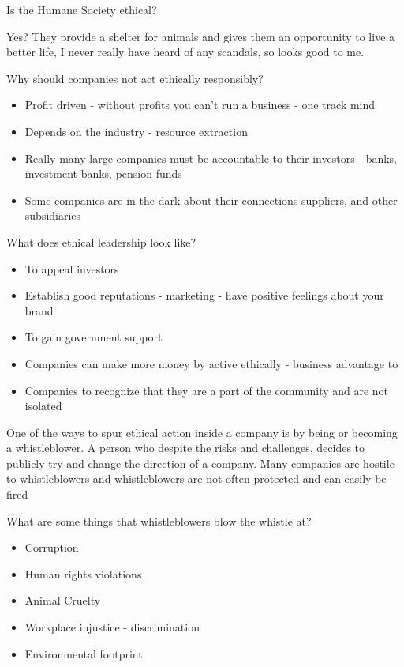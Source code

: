 \documentclass[11pt]{article}
\begin{document}
Is the Humane Society ethical?

Yes?
    They provide a shelter for animals and gives them an opportunity to live a better life, I never really have heard of any scandals, so looks good to me.


Why should companies not act ethically responsibly?

\begin{itemize}
    \item Profit driven - without profits you can't run a business - one track mind
    \item Depends on the industry - resource extraction
    \item Really many large companies must be accountable to their investors - banks, investment banks, pension funds
    \item Some companies are in the dark about their connections suppliers, and other subsidiaries
\end{itemize}

What does ethical leadership look like?

\begin{itemize}
    \item To appeal investors
    \item Establish good reputations - marketing - have positive feelings about your brand
    \item To gain government support
    \item Companies can make more money by active ethically - business advantage to 
    \item Companies to recognize that they are a part of the community and are not isolated
\end{itemize}

One of the ways to spur ethical action inside a company is by being or becoming a whistleblower. A person who despite the risks and challenges, decides to publicly try and change the direction of a company. Many companies are hostile to whistleblowers and whistleblowers are not often protected and can easily be fired

What are some things that whistleblowers blow the whistle at?

\begin{itemize}
    \item Corruption
    \item Human rights violations
    \item Animal Cruelty
    \item Workplace injustice - discrimination
    \item Environmental footprint
\end{itemize}
\end{document}
